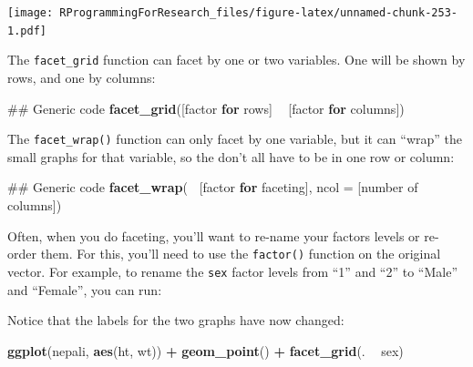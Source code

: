 \documentclass[]{book}
\makeatletter
\newenvironment{Shaded}{\begin{snugshade}}{\end{snugshade}}
\newcommand{\KeywordTok}[1]{\textcolor[rgb]{0.13,0.29,0.53}{\textbf{#1}}}
\newcommand{\DataTypeTok}[1]{\textcolor[rgb]{0.13,0.29,0.53}{#1}}
\newcommand{\DecValTok}[1]{\textcolor[rgb]{0.00,0.00,0.81}{#1}}
\newcommand{\StringTok}[1]{\textcolor[rgb]{0.31,0.60,0.02}{#1}}
\newcommand{\ControlFlowTok}[1]{\textcolor[rgb]{0.13,0.29,0.53}{\textbf{#1}}}
\newcommand{\OperatorTok}[1]{\textcolor[rgb]{0.81,0.36,0.00}{\textbf{#1}}}
\newcommand{\NormalTok}[1]{#1}
\newenvironment{kframe}{%
\medskip{}
\setlength{\fboxsep}{.8em}
 \def\at@end@of@kframe{}%
 \ifinner\ifhmode%
  \def\at@end@of@kframe{\end{minipage}}%
  \begin{minipage}{\columnwidth}%
 \fi\fi%
 \def\FrameCommand##1{\hskip\@totalleftmargin \hskip-\fboxsep
 \colorbox{shadecolor}{##1}\hskip-\fboxsep
     \hskip-\linewidth \hskip-\@totalleftmargin \hskip\columnwidth}%
 \MakeFramed {\advance\hsize-\width
   \@totalleftmargin\z@ \linewidth\hsize
   \@setminipage}}%
 {\par\unskip\endMakeFramed%
 \at@end@of@kframe}
\renewenvironment{Shaded}{\begin{kframe}}{\end{kframe}}
\theoremstyle{definition}
\theoremstyle{definition}
\theoremstyle{definition}
\theoremstyle{remark}
\makeatother
\begin{document}
\texttt{[image: RProgrammingForResearch\_files/figure-latex/unnamed-chunk-253-1.pdf]}

The \texttt{facet\_grid} function can facet by one or two variables. One
will be shown by rows, and one by columns:

\begin{Shaded}
\begin{Highlighting}[]
\NormalTok{## Generic code}
\KeywordTok{facet_grid}\NormalTok{([factor }\ControlFlowTok{for}\NormalTok{ rows] }\OperatorTok{~}\StringTok{ }\NormalTok{[factor }\ControlFlowTok{for}\NormalTok{ columns])}
\end{Highlighting}
\end{Shaded}

The \texttt{facet\_wrap()} function can only facet by one variable, but
it can ``wrap'' the small graphs for that variable, so the don't all
have to be in one row or column:

\begin{Shaded}
\begin{Highlighting}[]
\NormalTok{## Generic code}
\KeywordTok{facet_wrap}\NormalTok{(}\OperatorTok{~}\StringTok{ }\NormalTok{[factor }\ControlFlowTok{for}\NormalTok{ faceting], }\DataTypeTok{ncol =}\NormalTok{ [number of columns])}
\end{Highlighting}
\end{Shaded}

Often, when you do faceting, you'll want to re-name your factors levels
or re-order them. For this, you'll need to use the \texttt{factor()}
function on the original vector. For example, to rename the \texttt{sex}
factor levels from ``1'' and ``2'' to ``Male'' and ``Female'', you can
run:

\begin{Shaded}
\end{Shaded}

Notice that the labels for the two graphs have now changed:

\begin{Shaded}
\begin{Highlighting}[]
\KeywordTok{ggplot}\NormalTok{(nepali, }\KeywordTok{aes}\NormalTok{(ht, wt)) }\OperatorTok{+}\StringTok{ }
\StringTok{        }\KeywordTok{geom_point}\NormalTok{() }\OperatorTok{+}\StringTok{ }
\StringTok{        }\KeywordTok{facet_grid}\NormalTok{(. }\OperatorTok{~}\StringTok{ }\NormalTok{sex)}
\end{Highlighting}
\end{Shaded}
\end{document}
